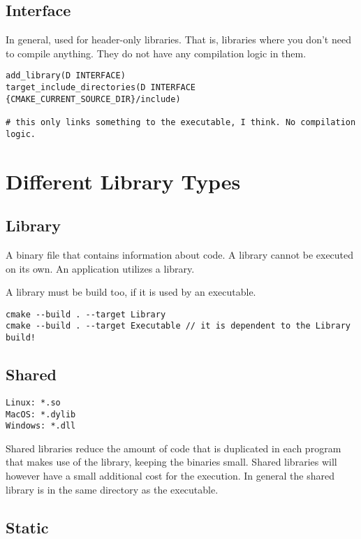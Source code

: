 \subsection{Interface}

In general, used for header-only libraries. That is, libraries where you don't need to compile anything. They do not have
any compilation logic in them.

\begin{verbatim}
add_library(D INTERFACE)
target_include_directories(D INTERFACE {CMAKE_CURRENT_SOURCE_DIR}/include)

# this only links something to the executable, I think. No compilation logic.
\end{verbatim}



\section{Different Library Types}

\subsection{Library}

A binary file that contains information about code.
A library cannot be executed on its own.
An application utilizes a library.

A library must be build too, if it is used by an executable.

\begin{verbatim}
cmake --build . --target Library
cmake --build . --target Executable // it is dependent to the Library build!
\end{verbatim}

\subsection{Shared}

\begin{verbatim}
Linux: *.so
MacOS: *.dylib
Windows: *.dll
\end{verbatim}

Shared libraries reduce the amount of code that is duplicated in each program that makes use of the library, keeping the binaries small.
Shared libraries will however have a small additional cost for the execution.
In general the shared library is in the same directory as the executable.

\subsection{Static}

